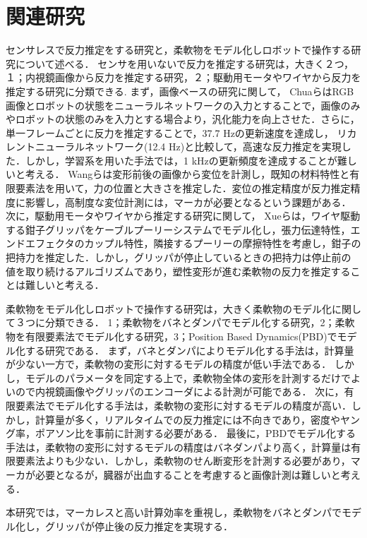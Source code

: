 \documentclass[a4paper]{jarticle}
\begin{document}
\section{関連研究}
センサレスで反力推定をする研究と，柔軟物をモデル化しロボットで操作する研究について述べる．
センサを用いないで反力を推定する研究は，大きく２つ，１；内視鏡画像から反力を推定する研究，２；駆動用モータやワイヤから反力を推定する研究に分類できる.
まず，画像ベースの研究に関して，
ChuaらはRGB画像とロボットの状態をニューラルネットワークの入力とすることで，画像のみやロボットの状態のみを入力とする場合より，汎化能力を向上させた\cite{ref_Chua}．さらに，単一フレームごとに反力を推定することで，37.7 Hzの更新速度を達成し，
リカレントニューラルネットワーク(12.4 Hz)と比較して，高速な反力推定を実現した．しかし，学習系を用いた手法では，1 kHzの更新頻度を達成することが難しいと考える．
Wangらは変形前後の画像から変位を計測し，既知の材料特性と有限要素法を用いて，力の位置と大きさを推定した\cite{ref_Wang}．変位の推定精度が反力推定精度に影響し，高制度な変位計測には，マーカが必要となるという課題がある．
次に，駆動用モータやワイヤから推定する研究に関して，
Xueらは，ワイヤ駆動する鉗子グリッパをケーブルプーリーシステムでモデル化し，張力伝達特性，エンドエフェクタのカップル特性，隣接するプーリーの摩擦特性を考慮し，鉗子の把持力を推定した\cite{ref_Xue}．しかし，グリッパが停止しているときの把持力は停止前の
値を取り続けるアルゴリズムであり，塑性変形が進む柔軟物の反力を推定することは難しいと考える．

柔軟物をモデル化しロボットで操作する研究は，大きく柔軟物のモデル化に関して３つに分類できる．
1；柔軟物をバネとダンパでモデル化する研究，2；柔軟物を有限要素法でモデル化する研究，3；Position Based Dynamics(PBD)でモデル化する研究である．
まず，バネとダンパによりモデル化する手法は，計算量が少ない一方で，柔軟物の変形に対するモデルの精度が低い手法である\cite{ref_MSD}．
しかし，モデルのパラメータを同定する上で，柔軟物全体の変形を計測するだけでよいので内視鏡画像やグリッパのエンコーダによる計測が可能である．
次に，有限要素法でモデル化する手法は，柔軟物の変形に対するモデルの精度が高い\cite{ref_FEM}．しかし，計算量が多く，リアルタイムでの反力推定には不向きであり，密度やヤング率，ポアソン比を事前に計測する必要がある．
最後に，PBDでモデル化する手法は，柔軟物の変形に対するモデルの精度はバネダンパより高く，計算量は有限要素法よりも少ない\cite{ref_PBD}．しかし，柔軟物のせん断変形を計測する必要があり，マーカが必要となるが，臓器が出血することを考慮すると画像計測は難しいと考える．

本研究では，マーカレスと高い計算効率を重視し，柔軟物をバネとダンパでモデル化し，グリッパが停止後の反力推定を実現する．
\end{document}
